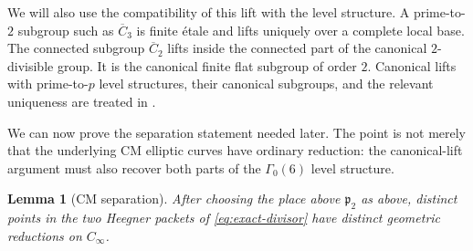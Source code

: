 \documentclass[11pt]{amsart}
\newtheorem{lemma}[theorem]{Lemma}
\theoremstyle{remark}
\numberwithin{equation}{section}
\begin{document}
We will also use the compatibility of this lift with the level structure.
A prime-to-$2$ subgroup such as $\overline C_3$ is finite \'etale and lifts
uniquely over a complete local base.  The connected subgroup
$\overline C_2$ lifts inside the connected part of the canonical
$2$-divisible group.  It is the canonical finite flat subgroup of order $2$.
Canonical lifts with prime-to-$p$ level structures, their canonical
subgroups, and the relevant uniqueness are treated in
\cite[Sections~5.1, 5.4, and Theorem~6.1]{BorgerGurney}.

We can now prove the separation statement needed later.  The point is not
merely that the underlying CM elliptic curves have ordinary reduction: the
canonical-lift argument must also recover both parts of the $\Gamma_0(6)$
level structure.

\begin{lemma}[CM separation]\label{lem:separation}
 After choosing the place above $\mathfrak p_2$ as above, distinct points in
 the two Heegner packets of \eqref{eq:exact-divisor} have distinct geometric
 reductions on $C_\infty$.
\end{lemma}
\end{document}
